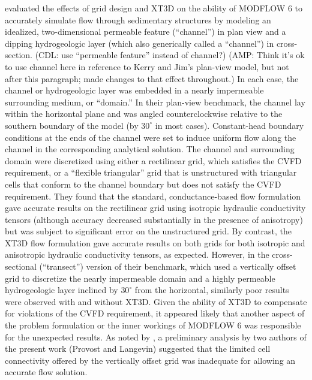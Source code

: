 \documentclass{article}
\begin{document}
\cite{bardot2022} evaluated the effects of grid design and XT3D on the ability of MODFLOW 6 to accurately simulate flow through sedimentary structures by modeling an idealized, two-dimensional permeable feature (``channel'') in plan view and a dipping hydrogeologic layer (which \cite{bardot2022} also generically called a ``channel'') in cross-section. {\color{red} (CDL: use ``permeable feature'' instead of channel?) (AMP: Think it's ok to use channel here in reference to Kerry and Jim's plan-view model, but not after this paragraph; made changes to that effect throughout.)} In each case, the channel or hydrogeologic layer was embedded in a nearly impermeable surrounding medium, or ``domain.'' In their plan-view benchmark, the channel lay within the horizontal plane and was angled counterclockwise relative to the southern boundary of the model (by $30^{\circ}$ in most cases). Constant-head boundary conditions at the ends of the channel were set to induce uniform flow along the channel in the corresponding analytical solution. The channel and surrounding domain were discretized using either a rectilinear grid, which satisfies the CVFD requirement, or a ``flexible triangular'' grid that is unstructured with triangular cells that conform to the channel boundary but does not satisfy the CVFD requirement. They found that the standard, conductance-based flow formulation gave accurate results on the rectilinear grid using isotropic hydraulic conductivity tensors (although accuracy decreased substantially in the presence of anisotropy) but was subject to significant error on the unstructured grid. By contrast, the XT3D flow formulation gave accurate results on both grids for both isotropic and anisotropic hydraulic conductivity tensors, as expected. However, in the cross-sectional (``transect'') version of their benchmark, which used a vertically offset grid to discretize the nearly impermeable domain and a highly permeable hydrogeologic layer inclined by $30^{\circ}$ from the horizontal, similarly poor results were observed with and without XT3D. Given the ability of XT3D to compensate for violations of the CVFD requirement, it appeared likely that another aspect of the problem formulation or the inner workings of MODFLOW 6 was responsible for the unexpected results.  As noted by \cite{bardot2022}, a preliminary analysis by two authors of the present work (Provost and Langevin) suggested that the limited cell connectivity offered by the vertically offset grid was inadequate for allowing an accurate flow solution.
\end{document}
